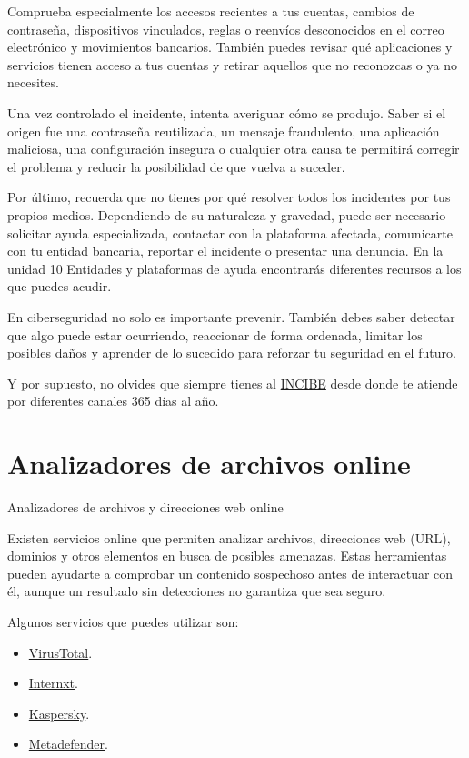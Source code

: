 \documentclass[
  spanish,
  a4paper,
  openany]{book}
\begin{document}
Comprueba especialmente los accesos recientes a tus cuentas, cambios de contraseña, dispositivos vinculados, reglas o reenvíos desconocidos en el correo electrónico y movimientos bancarios. También puedes revisar qué aplicaciones y servicios tienen acceso a tus cuentas y retirar aquellos que no reconozcas o ya no necesites.

Una vez controlado el incidente, intenta averiguar cómo se produjo. Saber si el origen fue una contraseña reutilizada, un mensaje fraudulento, una aplicación maliciosa, una configuración insegura o cualquier otra causa te permitirá corregir el problema y reducir la posibilidad de que vuelva a suceder.

Por último, recuerda que no tienes por qué resolver todos los incidentes por tus propios medios. Dependiendo de su naturaleza y gravedad, puede ser necesario solicitar ayuda especializada, contactar con la plataforma afectada, comunicarte con tu entidad bancaria, reportar el incidente o presentar una denuncia. En la unidad 10 Entidades y plataformas de ayuda encontrarás diferentes recursos a los que puedes acudir.

En ciberseguridad no solo es importante prevenir. También debes saber detectar que algo puede estar ocurriendo, reaccionar de forma ordenada, limitar los posibles daños y aprender de lo sucedido para reforzar tu seguridad en el futuro.

Y por supuesto, no olvides que siempre tienes al \hyperref[instituto-nacional-de-ciberseguridad]{INCIBE} desde donde te atiende por diferentes canales 365 días al año.

\section{Analizadores de archivos online}\label{analizadores-de-archivos-online}

Analizadores de archivos y direcciones web online

Existen servicios online que permiten analizar archivos, direcciones web (URL), dominios y otros elementos en busca de posibles amenazas. Estas herramientas pueden ayudarte a comprobar un contenido sospechoso antes de interactuar con él, aunque un resultado sin detecciones no garantiza que sea seguro.

Algunos servicios que puedes utilizar son:

\begin{itemize}
\item
  \href{https://www.virustotal.com/gui/home/upload}{VirusTotal}.
\item
  \href{https://internxt.com/es/virus-scanner}{Internxt}.
\item
  \href{https://opentip.kaspersky.com/}{Kaspersky}.
\item
  \href{https://metadefender.opswat.com}{Metadefender}.
\end{itemize}
\end{document}
